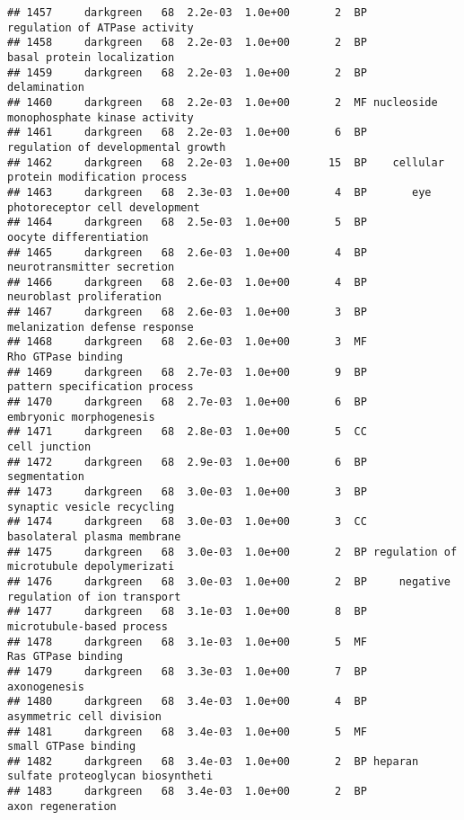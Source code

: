 \documentclass[]{article}
\begin{document}
\begin{verbatim}
## 1457     darkgreen   68  2.2e-03  1.0e+00       2  BP            regulation of ATPase activity
## 1458     darkgreen   68  2.2e-03  1.0e+00       2  BP               basal protein localization
## 1459     darkgreen   68  2.2e-03  1.0e+00       2  BP                             delamination
## 1460     darkgreen   68  2.2e-03  1.0e+00       2  MF nucleoside monophosphate kinase activity
## 1461     darkgreen   68  2.2e-03  1.0e+00       6  BP       regulation of developmental growth
## 1462     darkgreen   68  2.2e-03  1.0e+00      15  BP    cellular protein modification process
## 1463     darkgreen   68  2.3e-03  1.0e+00       4  BP       eye photoreceptor cell development
## 1464     darkgreen   68  2.5e-03  1.0e+00       5  BP                   oocyte differentiation
## 1465     darkgreen   68  2.6e-03  1.0e+00       4  BP               neurotransmitter secretion
## 1466     darkgreen   68  2.6e-03  1.0e+00       4  BP                 neuroblast proliferation
## 1467     darkgreen   68  2.6e-03  1.0e+00       3  BP            melanization defense response
## 1468     darkgreen   68  2.6e-03  1.0e+00       3  MF                       Rho GTPase binding
## 1469     darkgreen   68  2.7e-03  1.0e+00       9  BP            pattern specification process
## 1470     darkgreen   68  2.7e-03  1.0e+00       6  BP                  embryonic morphogenesis
## 1471     darkgreen   68  2.8e-03  1.0e+00       5  CC                            cell junction
## 1472     darkgreen   68  2.9e-03  1.0e+00       6  BP                             segmentation
## 1473     darkgreen   68  3.0e-03  1.0e+00       3  BP               synaptic vesicle recycling
## 1474     darkgreen   68  3.0e-03  1.0e+00       3  CC              basolateral plasma membrane
## 1475     darkgreen   68  3.0e-03  1.0e+00       2  BP regulation of microtubule depolymerizati
## 1476     darkgreen   68  3.0e-03  1.0e+00       2  BP     negative regulation of ion transport
## 1477     darkgreen   68  3.1e-03  1.0e+00       8  BP                microtubule-based process
## 1478     darkgreen   68  3.1e-03  1.0e+00       5  MF                       Ras GTPase binding
## 1479     darkgreen   68  3.3e-03  1.0e+00       7  BP                             axonogenesis
## 1480     darkgreen   68  3.4e-03  1.0e+00       4  BP                 asymmetric cell division
## 1481     darkgreen   68  3.4e-03  1.0e+00       5  MF                     small GTPase binding
## 1482     darkgreen   68  3.4e-03  1.0e+00       2  BP heparan sulfate proteoglycan biosyntheti
## 1483     darkgreen   68  3.4e-03  1.0e+00       2  BP                        axon regeneration

\end{verbatim}
\end{document}
